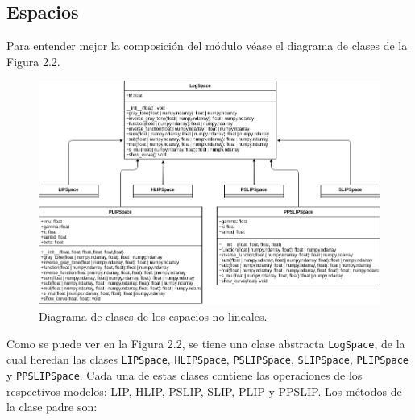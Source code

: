 \subsection{Espacios}

Para entender mejor la composici\'on del m\'odulo v\'ease el diagrama de clases de la Figura 2.2.

\begin{figure}[h]
	\begin{center}
		\includegraphics[width=16.0 cm]{images/spaces_class_diagram.png}
		\caption{Diagrama de clases de los espacios no lineales.}
	\end{center}
\end{figure}

Como se puede ver en la Figura 2.2, se tiene una clase abstracta \verb|LogSpace|, de la cual heredan las clases \verb|LIPSpace|, \verb|HLIPSpace|, \verb|PSLIPSpace|, \verb|SLIPSpace|, \verb|PLIPSpace| y \verb|PPSLIPSpace|. Cada una de estas clases contiene las operaciones de los respectivos modelos: LIP, HLIP, PSLIP, SLIP, PLIP y PPSLIP. Los m\'etodos de la clase padre son:

